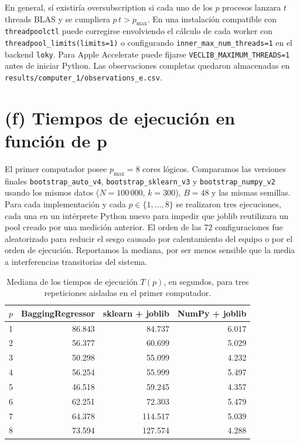 \documentclass[12pt, letterpaper]{article}
\begin{document}
En general, sí existiría oversubscription si cada uno de los $p$ procesos
lanzara $t$ threads BLAS y se cumpliera $p\,t>p_{\max}$. En una instalación
compatible con \texttt{threadpoolctl} puede corregirse envolviendo el cálculo
de cada worker con \texttt{threadpool\_limits(limits=1)} o configurando
\texttt{inner\_max\_num\_threads=1} en el backend \texttt{loky}. Para Apple
Accelerate puede fijarse \texttt{VECLIB\_MAXIMUM\_THREADS=1} antes de iniciar
Python. Las observaciones completas quedaron almacenadas en
\texttt{results/computer\_1/observations\_e.csv}.


\section*{(f) Tiempos de ejecución en función de p}

El primer computador posee $p_{\max}=8$ cores lógicos. Comparamos las
versiones finales \texttt{bootstrap\_auto\_v4},
\texttt{bootstrap\_sklearn\_v3} y \texttt{bootstrap\_numpy\_v2} usando los
mismos datos ($N=100\,000$, $k=300$), $B=48$ y las mismas semillas. Para cada
implementación y cada $p\in\{1,\ldots,8\}$ se realizaron tres ejecuciones,
cada una en un intérprete Python nuevo para impedir que joblib reutilizara un
pool creado por una medición anterior. El orden de las 72 configuraciones fue aleatorizado para reducir el sesgo causado
por calentamiento del equipo o por el orden de ejecución. Reportamos la mediana,
por ser menos sensible que la media a interferencias transitorias del sistema.

\begin{table}[h]
    \centering
    \small
    \begin{tabular}{|c|r|r|r|}
    \hline
    $p$ & \textbf{BaggingRegressor} & \textbf{sklearn + joblib} & \textbf{NumPy + joblib} \\
    \hline
    1 & 86.843 & 84.737 & 6.017 \\
    2 & 56.377 & 60.699 & 5.029 \\
    3 & 50.298 & 55.099 & 4.232 \\
    4 & 56.254 & 55.999 & 5.497 \\
    5 & 46.518 & 59.245 & 4.357 \\
    6 & 62.251 & 72.303 & 5.479 \\
    7 & 64.378 & 114.517 & 5.039 \\
    8 & 73.594 & 127.574 & 4.288 \\
    \hline
    \end{tabular}
    \caption{Mediana de los tiempos de ejecución $T(p)$, en segundos, para
    tres repeticiones aisladas en el primer computador.}
    \label{tab:tiempos-f}
\end{table}
\end{document}
